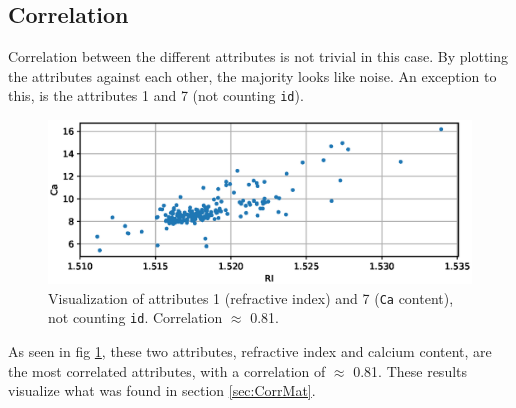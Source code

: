 \subsection{Correlation}

Correlation between the different attributes is not trivial in this case. By plotting the attributes against each other, the majority looks like noise. An exception to this, is the attributes 1 and 7 (not counting \texttt{id}). 

\begin{figure}[H]
\centering
\includegraphics[width=0.9\linewidth]{fig/Correlated.eps} 
\caption{Visualization of attributes 1 (refractive index) and 7 (\texttt{Ca} content), not counting \texttt{id}. Correlation $\approx$ 0.81.  }
\label{fig:correlated}
\end{figure}

As seen in fig \ref{fig:correlated}, these two attributes, refractive index and calcium content, are the most correlated attributes, with a correlation of $\approx$ 0.81. These results visualize what was found in section \ref{sec:CorrMat}.